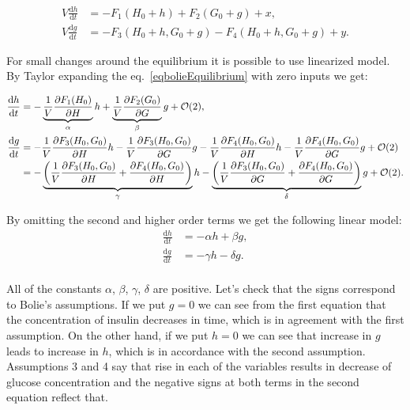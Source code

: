 \documentclass{article}
\providecommand{\m}[1]{\ensuremath{\mathrm{#1}}}
\providecommand{\p}[1]{\ensuremath{\partial #1}}
\begin{document}
\begin{equation}
\label{eqbolieEquilibrium}
\begin{aligned}
V\frac{\m{d}h}{\m{d}t}&=-F_1(H_0+h)+F_2(G_0+g)+ x,\\
V\frac{\m{d}g}{\m{d}t}&=-F_3(H_0+h,G_0+g)-F_4(H_0+h,G_0+g)+ y.
\end{aligned}
\end{equation}

For small changes around the equilibrium it is possible to use linearized model. By Taylor expanding the eq.~\ref{eqbolieEquilibrium} with zero inputs we get:

\begin{align*}
\frac{\m{d}h}{\m{d}t}&=-\underbrace{%
		\frac{1}{V}\frac{\p F_1(H_0)}{\p H}}_{\alpha}h+%
%
\underbrace{%
		\frac{1}{V}\frac{\p F_2(G_0)}{\p G}}_{\beta}g+\mathcal{O}(2), \\%
%
\frac{\m{d}g}{\m{d}t}&=-\frac{1}{V}\frac{\p F_3(H_0, G_0)}{\p H}h- \frac{1}{V}\frac{\p F_3(H_0, G_0)}{\p G}g-\frac{1}{V}\frac{\p F_4(H_0, G_0)}{\p H}h-\frac{1}{V}\frac{\p F_4(H_0, G_0)}{\p G}g+\mathcal{O}(2)\\%
%
&=-\underbrace{%
\left(\frac{1}{V}\frac{\p F_3(H_0, G_0)}{\p H}+\frac{\p F_4(H_0, G_0)}{\p H}\right)}_{\gamma}h%
-\underbrace{%
\left(\frac{1}{V}\frac{\p F_3(H_0, G_0)}{\p G}+\frac{\p F_4(H_0, G_0)}{\p G}\right)}_{\delta} g+\mathcal{O}(2).
\end{align*}

By omitting the second and higher order terms we get the following linear model:
\begin{equation}
\label{eqLinearized}
\begin{aligned}
\frac{\m{d}h}{\m{d}t}&=-\alpha h + \beta g,\\
\frac{\m{d}g}{\m{d}t}&=-\gamma h - \delta g.\\
\end{aligned}
\end{equation}

All of the constants $\alpha$, $\beta$, $\gamma$, $\delta$ are positive. Let's check that the signs correspond to Bolie's assumptions. If we put $g=0$ we can see from the first equation that the concentration of insulin decreases in time, which is in agreement with the first assumption.
On the other hand, if we put $h=0$ we can see that increase in $g$ leads to increase in $h$, which is in accordance with the second assumption.
Assumptions 3 and 4 say that rise in each of the variables results in   decrease of glucose concentration and the negative signs at both terms in the second equation reflect that.   
\end{document}
